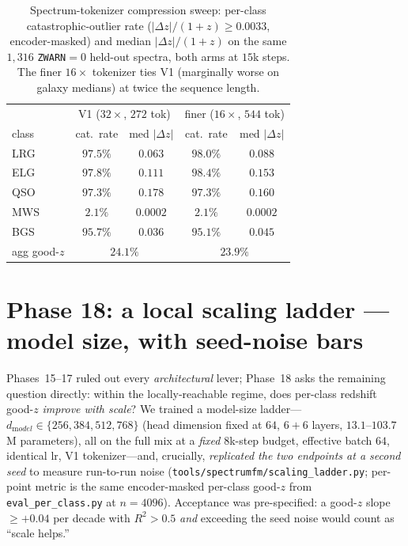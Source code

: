 \documentclass[11pt,letterpaper]{article}
\begin{document}
\begin{table}[t]
\centering
\caption{Spectrum-tokenizer compression sweep: per-class catastrophic-outlier
rate ($|\Delta z|/(1{+}z) \ge 0.0033$, encoder-masked) and median
$|\Delta z|/(1{+}z)$ on the same $1{,}316$ \texttt{ZWARN}${=}0$ held-out
spectra, both arms at $15$k steps. The finer $16{\times}$ tokenizer ties V1
(marginally worse on galaxy medians) at twice the sequence length.}
\label{tab:finer}
\begin{tabular}{lcccc}
\toprule
 & \multicolumn{2}{c}{V1 ($32\times$, $272$ tok)} & \multicolumn{2}{c}{finer ($16\times$, $544$ tok)} \\
class & cat.\ rate & med $|\Delta z|$ & cat.\ rate & med $|\Delta z|$ \\
\midrule
LRG & $97.5\%$ & $0.063$ & $98.0\%$ & $0.088$ \\
ELG & $97.8\%$ & $0.111$ & $98.4\%$ & $0.153$ \\
QSO & $97.3\%$ & $0.178$ & $97.3\%$ & $0.160$ \\
MWS & $2.1\%$  & $0.0002$ & $2.1\%$ & $0.0002$ \\
BGS & $95.7\%$ & $0.036$ & $95.1\%$ & $0.045$ \\
\midrule
agg good-$z$ & \multicolumn{2}{c}{$24.1\%$} & \multicolumn{2}{c}{$23.9\%$} \\
\bottomrule
\end{tabular}
\end{table}

\section{Phase 18: a local scaling ladder --- model size, with seed-noise bars}
\label{sec:phase18}

Phases~15--17 ruled out every \emph{architectural} lever; Phase~18 asks the
remaining question directly: within the locally-reachable regime, does
per-class redshift good-$z$ \emph{improve with scale}? We trained a model-size
ladder---$d_{\mathrm model}\in\{256,384,512,768\}$ (head dimension fixed at
$64$, $6{+}6$ layers, $13.1$--$103.7$\,M parameters), all on the full mix at a
\emph{fixed} $8$k-step budget, effective batch $64$, identical lr, V1
tokenizer---and, crucially, \emph{replicated the two endpoints at a second seed}
to measure run-to-run noise (\texttt{tools/spectrumfm/scaling\_ladder.py};
per-point metric is the same encoder-masked per-class good-$z$ from
\texttt{eval\_per\_class.py} at $n{=}4096$). Acceptance was pre-specified: a
good-$z$ slope $\ge +0.04$ per decade with $R^2>0.5$ \emph{and} exceeding the
seed noise would count as ``scale helps.''
\end{document}

